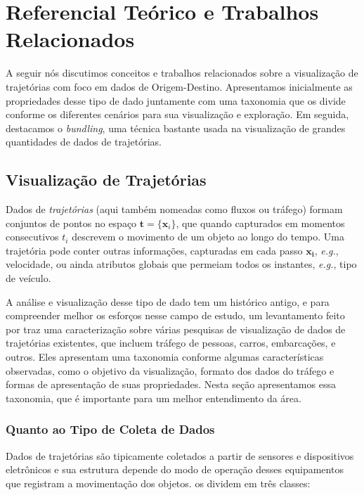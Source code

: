 
\chapter{Referencial Teórico e Trabalhos Relacionados}
\label{cap:referencial-teorico}

  A seguir nós discutimos conceitos e trabalhos relacionados sobre a visualização de
trajetórias com foco em dados de Origem-Destino. Apresentamos inicialmente as propriedades
desse tipo de dado juntamente com uma taxonomia que os divide conforme os diferentes cenários para
sua visualização e exploração. Em seguida, destacamos o \emph{bundling},
uma técnica bastante usada na visualização de grandes quantidades de dados de trajetórias.

\section{Visualização de Trajetórias}
\label{sec:dados-de-trajetorias}

Dados de \emph{trajetórias} (aqui também nomeadas como fluxos ou tráfego)
formam conjuntos de pontos no espaço $\mathbf{t} = \{\mathbf{x}_i\}$, que quando
capturados em momentos consecutivos $t_i$ descrevem o movimento de um objeto ao
longo do tempo. Uma trajetória pode conter outras informações, capturadas em
cada passo $\mathbf{x_i}$, \emph{e.g.}, velocidade, ou ainda atributos globais
que permeiam todos os instantes, \emph{e.g.}, tipo de veículo.

A análise e visualização desse tipo de dado tem um histórico antigo, e para
compreender melhor os esforços nesse campo de estudo, um levantamento feito por
\citet{Chen2015} traz uma caracterização sobre várias pesquisas de visualização
de dados de trajetórias existentes, que incluem tráfego de pessoas, carros,
embarcações, e outros. Eles apresentam uma taxonomia conforme algumas
características observadas, como o objetivo da visualização, formato dos dados
do tráfego e formas de apresentação de suas propriedades. Nesta seção
apresentamos essa taxonomia, que é importante para um melhor entendimento da
área.

\subsection{Quanto ao Tipo de Coleta de Dados}

Dados de trajetórias são tipicamente coletados a partir de sensores e
dispositivos eletrônicos e sua estrutura depende do modo de operação desses
equipamentos que registram a movimentação dos objetos. \citet{Chen2015} os dividem em três classes:

